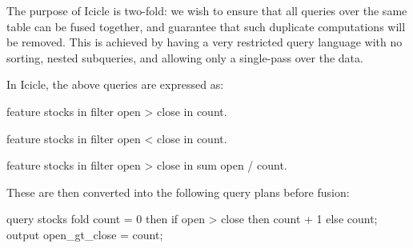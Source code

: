 The purpose of Icicle is two-fold: we wish to ensure that all queries over the same table can be fused together, and guarantee that such duplicate computations will be removed.
This is achieved by having a very restricted query language with no sorting, nested subqueries, and allowing only a single-pass over the data.

In Icicle, the above queries are expressed as:
\begin{code}
feature stocks
in filter open > close
in count.

feature stocks
in filter open < close
in count.

feature stocks
in filter open > close
in sum open / count.
\end{code}

These are then converted into the following query plans before fusion:
\begin{code}
query stocks {
  fold count  = 0
           then if open > close then count + 1 else count;
  output open_gt_close = count;
}
\end{code}


